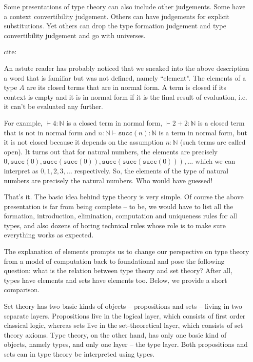 \documentclass[declaration,mgr,english,shortabstract]{iithesis}
\newcommand{\m}[1]{\texttt{#1}}
\newcommand{\term}[3]{#1 \vdash #2 : #3}
\newcommand{\N}{\mathbb{N}}
\newcommand{\suc}[1]{\m{succ}(#1)}
\begin{document}
Some presentations of type theory can also include other judgements. Some have a context convertibility judgement. Others can have judgements for explicit substitutions. Yet others can drop the type formation judgement and type convertibility judgement and go with universes.

cite: 

An astute reader has probably noticed that we sneaked into the above description a word that is familiar but was not defined, namely ``element''. The elements of a type $A$ are its closed terms that are in normal form. A term is closed if its context is empty and it is in normal form if it is the final result of evaluation, i.e. it can't be evaluated any further.

For example, $\term{}{4}{\N}$ is a closed term in normal form, $\term{}{2 + 2}{\N}$ is a closed term that is not in normal form and $\term{n : \N}{\suc{n}}{\N}$ is a term in normal form, but it is not closed because it depends on the assumption $n : \N$ (such terms are called open). It turns out that for natural numbers, the elements are precisely $0, \suc{0}, \suc{\suc{0}}, \suc{\suc{\suc{0}}}, \dots$ which we can interpret as $0, 1, 2, 3, \dots$ respectively. So, the elements of the type of natural numbers are precisely the natural numbers. Who would have guessed!

That's it. The basic idea behind type theory is very simple. Of course the above presentation is far from being complete -- to be, we would have to list all the formation, introduction, elimination, computation and uniqueness rules for all types, and also dozens of boring technical rules whose role is to make sure everything works as expected.

The explanation of elements prompts us to change our perspective on type theory from a model of computation back to foundational and pose the following question: what is the relation between type theory and set theory? After all, types have elements and sets have elements too. Below, we provide a short comparison.

Set theory has two basic kinds of objects -- propositions and sets -- living in two separate layers. Propositions live in the logical layer, which consists of first order classical logic, whereas sets live in the set-theoretical layer, which consists of set theory axioms. Type theory, on the other hand, has only one basic kind of objects, namely types, and only one layer -- the type layer. Both propositions and sets can in type theory be interpreted using types.
\end{document}
